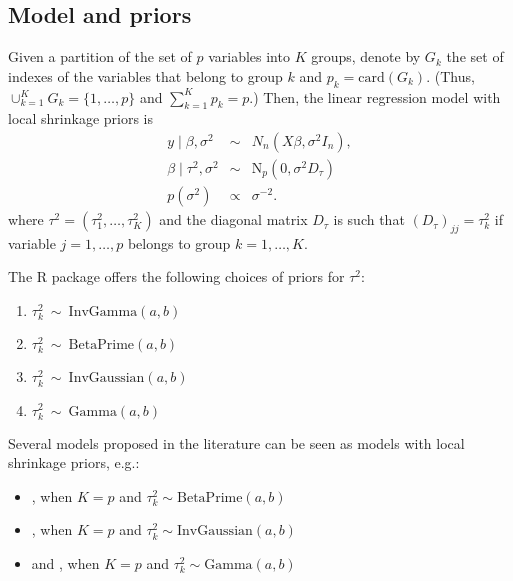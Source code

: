 \documentclass[nojss]{jss}
\begin{document}
\subsection{Model and priors}

Given a partition of the set of $p$ variables into $K$ groups, denote by $G_k$
the set of indexes of the variables that belong to group $k$ and
$p_k = \mathrm{card}(G_k)$. (Thus, $\cup_{k=1}^{K}{G_k} = \{ 1, \ldots, p\}$ and
$\sum_{k=1}^{K}{p_k} = p$.) Then, the linear regression model with local
shrinkage priors is
\begin{eqnarray}
	\label{linear_model_local}
	y \mid \beta, \sigma^2 &\sim&  N_n(X\beta, \sigma^{2}{I}_n),\\
	\beta \mid \tau^2, \sigma^2 &\sim& \mathrm{N}_p(0, \sigma^{2} D_{\tau})\\
	p(\sigma^{2}) &\propto & \sigma^{-2}.
\end{eqnarray}
where $\tau^2=(\tau^2_1, \ldots, \tau^2_K)$ and the diagonal matrix $D_{\tau}$ is such that $(D_{\tau})_{jj} = \tau_k^2$ if variable $j = 1, \ldots, p$ belongs to group $k = 1, \ldots, K$.

The R package  offers the following choices of priors for $\tau^2$:
\begin{enumerate}
	\item $\tau^2_k \ \sim\  \mathrm{InvGamma}(a, b)$\\[-20pt]
	\item $\tau^2_k \ \sim\  \mathrm{BetaPrime}(a, b)$\\[-20pt]
	\item $\tau^2_k \ \sim\  \mathrm{InvGaussian}(a, b)$\\[-20pt]
	\item $\tau^2_k \ \sim\  \mathrm{Gamma}(a, b)$
\end{enumerate}

Several models proposed in the literature can be seen as models with local shrinkage priors, e.g.:
\begin{itemize}
  \item \citet{bai2018}, when $K=p$ and $\tau^2_k  \sim  \mathrm{BetaPrime}(a, b)$ 
  \item \citet{caron2008}, when $K=p$ and $\tau^2_k  \sim \mathrm{InvGaussian}(a, b)$ 
  \item \citet{brown2010} and \citet{caron2008}, when $K=p$ and $\tau^2_k \sim \mathrm{Gamma}(a, b)$ 
\end{itemize}
\end{document}
